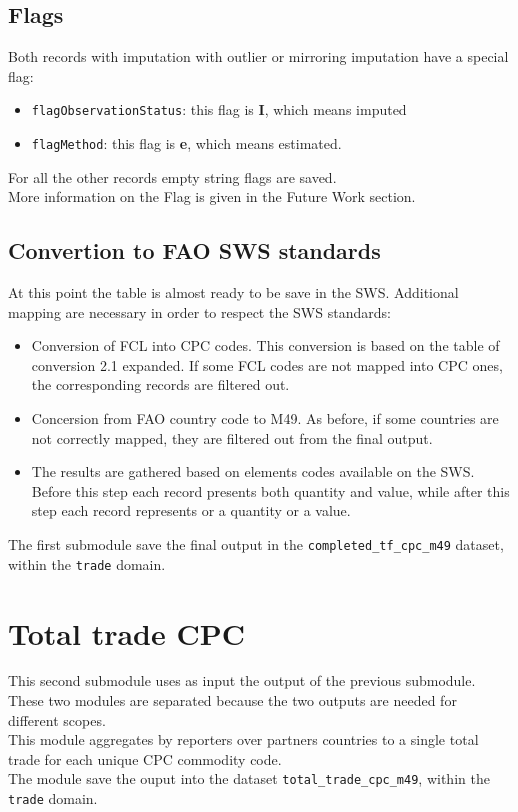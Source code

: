 \documentclass[nojss]{jss}\usepackage[]{graphicx}\usepackage[]{color}
\begin{document}
\subsection{Flags}
Both records with imputation with outlier or mirroring imputation have a special flag:
\begin{itemize}
\item {\tt flagObservationStatus}: this flag is {\bf I}, which means imputed
\item {\tt flagMethod}: this flag is {\bf e}, which means estimated.
\end{itemize}
For all the other records empty string flags are saved.\\
More information on the Flag is given in the Future Work section.

\subsection{Convertion to FAO SWS standards}
At this point the table is almost ready to be save in the SWS. Additional mapping are necessary in order to respect the SWS standards:
\begin{itemize}
\item Conversion of FCL into CPC codes. This conversion is based on the table of conversion 2.1 expanded. If some FCL codes are not mapped into CPC ones, the corresponding records are filtered out.
\item Concersion from FAO country code to M49. As before, if some countries are not correctly mapped, they are filtered out from the final output.
\item The results are gathered based on elements codes available on the SWS. Before this step each record presents both quantity and value, while after this step each record represents or a quantity or a value.
\end{itemize}

The first submodule save the final output in the {\tt completed\_tf\_cpc\_m49} dataset, within the {\tt trade} domain.

\section{Total trade CPC}
This second submodule uses as input the output of the previous submodule. These two modules are separated because the two outputs are needed for different scopes.\\
This module aggregates by reporters over partners countries to a single total trade for each unique CPC commodity code.\\
The module save the ouput into the dataset {\tt total\_trade\_cpc\_m49}, within the {\tt trade} domain.
\end{document}
